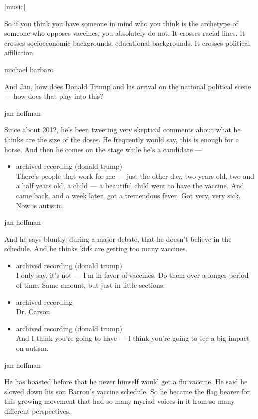 {[}music{]}

So if you think you have someone in mind who you think is the archetype
of someone who opposes vaccines, you absolutely do not. It crosses
racial lines. It crosses socioeconomic backgrounds, educational
backgrounds. It crosses political affiliation.

michael barbaro

And Jan, how does Donald Trump and his arrival on the national political
scene --- how does that play into this?

jan hoffman

Since about 2012, he's been tweeting very skeptical comments about what
he thinks are the size of the doses. He frequently would say, this is
enough for a horse. And then he comes on the stage while he's a
candidate ---

\begin{itemize}
\tightlist
\item
  archived recording (donald trump)\\
  There's people that work for me --- just the other day, two years old,
  two and a half years old, a child --- a beautiful child went to have
  the vaccine. And came back, and a week later, got a tremendous fever.
  Got very, very sick. Now is autistic.
\end{itemize}

jan hoffman

And he says bluntly, during a major debate, that he doesn't believe in
the schedule. And he thinks kids are getting too many vaccines.

\begin{itemize}
\item
  archived recording (donald trump)\\
  I only say, it's not --- I'm in favor of vaccines. Do them over a
  longer period of time. Same amount, but just in little sections.
\item
  archived recording\\
  Dr. Carson.
\item
  archived recording (donald trump)\\
  And I think you're going to have --- I think you're going to see a big
  impact on autism.
\end{itemize}

jan hoffman

He has boasted before that he never himself would get a flu vaccine. He
said he slowed down his son Barron's vaccine schedule. So he became the
flag bearer for this growing movement that had so many myriad voices in
it from so many different perspectives.

